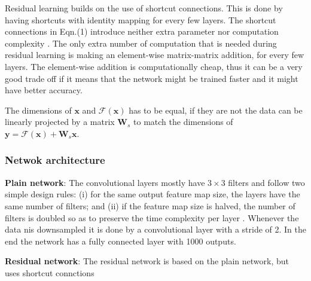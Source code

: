 Residual learning builds on the use of shortcut connections. 
This is done by having shortcuts with identity mapping for every few layers.
The shortcut connections in Eqn.(1) introduce neither extra parameter nor computation complexity \cite{resnet}.
The only extra number of computation that is needed during residual learning is making an element-wise matrix-matrix addition, for every few layers.
The element-wise addition is computationally cheap, thus it can be a very good trade off if it means that the network might be trained faster and it might have better accuracy.

The dimensions of $\bm{x}$ and $\mathcal{F}(\bm{x})$ has to be equal, if they are not the data can be linearly projected by a matrix $\bm{W}_s$ to match the dimensions of $\bm{y} = \mathcal{F}(\bm{x}) + \bm{W}_s\bm{x}$.

\subsubsection{Netwok architecture}%

\textbf{Plain network}: The convolutional layers mostly have $3 \times 3$ filters and follow two simple design rules:
(i) for the same output
feature map size, the layers have the same number of filters; and
(ii) if the feature map size is halved, the number of filters is doubled so as to preserve the time complexity per layer
\cite{resnet}.
Whenever the data nis downsampled it is done by a convolutional layer with a stride of 2.
In the end the network has a fully connected layer with 1000 outputs.

\textbf{Residual network}: 
The residual network is based on the plain network, but uses shortcut connctions

